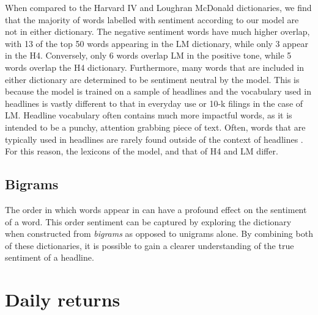 When compared to the Harvard IV and Loughran McDonald dictionaries, we find that the majority of words labelled with sentiment according to our model are not in either dictionary. The negative sentiment words have much higher overlap, with 13 of the top 50 words appearing in the LM dictionary, while only 3 appear in the H4. Conversely, only 6 words overlap LM in the positive tone, while 5 words overlap the H4 dictionary. Furthermore, many words that are included in either dictionary are determined to be sentiment neutral by the model. This is because the model is trained on a sample of headlines and the vocabulary used in headlines is vastly different to that in everyday use or 10-k filings in the case of LM. Headline vocabulary often contains much more impactful words, as it is intended to be a punchy, attention grabbing piece of text. Often, words that are typically used in headlines are rarely found outside of the context of headlines \cite{language-newspapers}. For this reason, the lexicons of the model, and that of H4 and LM differ.

\subsection{Bigrams}
The order in which words appear in can have a profound effect on the sentiment of a word. This order sentiment can be captured by exploring the dictionary when constructed from \textit{bigrams} as opposed to unigrams alone. By combining both of these dictionaries, it is possible to gain a clearer understanding of the true sentiment of a headline.      

\section{Daily returns}

